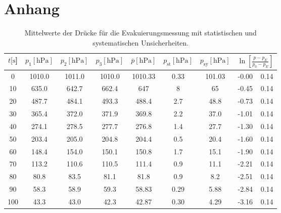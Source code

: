 \section*{Anhang}
\begin{table}[H]
    \centering
      \caption{Mittelwerte der Drücke für die Evakuierungsmessung mit statistischen und systematischen Unsicherheiten.}
      \label{tab:Dreh_Evak}
      \tiny{
      \begin{tabular}{
        S[table-format=3.0] 
        S[table-format=4.2]
        S[table-format=4.2]
        S[table-format=4.2]
        S[table-format=4.2] 
        S[table-format=1.3] 
        S[table-format=3.2] 
        S[table-format=2.2] @{${}\pm{}$} S[table-format=1.2]}
        \toprule
        {$t [\si{\second}$]} &
        {$p_1 [\si{\hecto\pascal}]$} &
        {$p_2 [\si{\hecto\pascal}]$} &
        {$p_3 [\si{\hecto\pascal}]$} & 
        {$\bar{p} [\si{\hecto\pascal}]$} & 
        {$p_\text{st} [\si{\hecto\pascal}]$} & 
        {$p_\text{sy} [\si{\hecto\pascal}]$} & 
         \\            
           & 1010.0 & 1011.0 & 1010.0 & 1010.33 & 0.33    & 101.03 & -0.00 & 0.14 \\
        10  & 635.0  & 642.7  & 662.4  & 647     & 8       & 65     & -0.45 & 0.14 \\
        20  & 487.7  & 484.1  & 493.3  & 488.4   & 2.7     & 48.8   & -0.73 & 0.14 \\
        30  & 365.4  & 372.0  & 371.9  & 369.8   & 2.2     & 37.0   & -1.01 & 0.14 \\
        40  & 274.1  & 278.5  & 277.7  & 276.8   & 1.4     & 27.7   & -1.30 & 0.14 \\
        50  & 203.4  & 205.0  & 204.8  & 204.4   & 0.5     & 20.4   & -1.60 & 0.14 \\
        60  & 148.4  & 154.0  & 150.1  & 150.8   & 1.7     & 15.1   & -1.90 & 0.14 \\
        70  & 113.2  & 110.6  & 110.5  & 111.4   & 0.9     & 11.1   & -2.21 & 0.14 \\
        80  & 80.8   & 83.5   & 81.1   & 81.8    & 0.9     & 8.2    & -2.51 & 0.14 \\
        90  & 58.3   & 58.9   & 59.3   & 58.83   & 0.29    & 5.88   & -2.84 & 0.14 \\
        100 & 43.3   & 43.0   & 42.3   & 42.87   & 0.30    & 4.29   & -3.16 & 0.14 \\

\end{tabular}}
\end{table}

